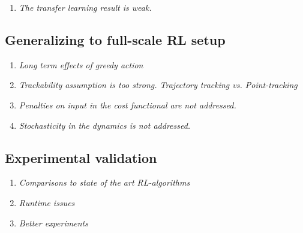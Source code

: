 \documentclass[10pt,a4paper]{article}
\newtheorem{thm}{Theorem}
\begin{document}
\begin{enumerate}
%

\item \emph{The transfer learning result is weak.}

\end{enumerate}

\subsection{Generalizing to full-scale RL setup} 

\begin{enumerate}
\item \emph{Long term effects of greedy action} 

\item \emph{Trackability assumption is too strong. Trajectory tracking vs. Point-tracking} 

\item \emph{Penalties on input in the cost functional are not addressed.} 

\item \emph{Stochasticity in the dynamics is not addressed.}
\end{enumerate}

\subsection{Experimental validation}

\begin{enumerate}
\item \emph{Comparisons to state of the art RL-algorithms}

\item \emph{Runtime issues}

\item \emph{Better experiments}
\end{enumerate}



\end{document}
